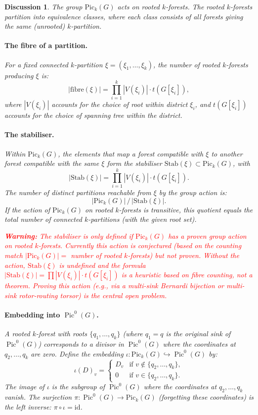 \documentclass[11pt]{article}
\newcommand{\warning}[1]{\textcolor{red}{\textbf{Warning:} #1}}
\newcommand{\Pic}{\operatorname{Pic}^0}
\newtheorem{answer}{Discussion}
\begin{document}
\begin{answer}
The group $\mathrm{Pic}_k(G)$ acts on rooted $k$-forests. The rooted
$k$-forests partition into equivalence classes, where each class consists of
all forests giving the same (unrooted) $k$-partition.

\paragraph{The fibre of a partition.}
For a fixed connected $k$-partition $\xi = (\xi_1, \ldots, \xi_k)$, the
number of rooted $k$-forests producing $\xi$ is:
\[
  |\text{fibre}(\xi)| = \prod_{i=1}^{k} |V(\xi_i)| \cdot t(G[\xi_i]),
\]
where $|V(\xi_i)|$ accounts for the choice of root within district $\xi_i$,
and $t(G[\xi_i])$ accounts for the choice of spanning tree within the district.

\paragraph{The stabiliser.}
Within $\mathrm{Pic}_k(G)$, the elements that map a forest compatible with
$\xi$ to another forest compatible with the same $\xi$ form the
\emph{stabiliser} $\mathrm{Stab}(\xi) \subset \mathrm{Pic}_k(G)$, with
\[
  |\mathrm{Stab}(\xi)| = \prod_{i=1}^{k} |V(\xi_i)| \cdot t(G[\xi_i]).
\]
The number of distinct partitions reachable from $\xi$ by the group action is:
\[
  |\mathrm{Pic}_k(G)| \,/\, |\mathrm{Stab}(\xi)|.
\]
If the action of $\mathrm{Pic}_k(G)$ on rooted $k$-forests is transitive,
this quotient equals the total number of connected $k$-partitions (with the
given root set).

\warning{The stabiliser is only defined if $\mathrm{Pic}_k(G)$ has a proven
group action on rooted $k$-forests. Currently this action is conjectured (based
on the counting match $|\mathrm{Pic}_k(G)| = $ number of rooted $k$-forests)
but not proven. Without the action, $\mathrm{Stab}(\xi)$ is undefined and the
formula $|\mathrm{Stab}(\xi)| = \prod |V(\xi_i)| \cdot t(G[\xi_i])$ is a
heuristic based on fibre counting, not a theorem. Proving this action (e.g.,
via a multi-sink Bernardi bijection or multi-sink rotor-routing torsor) is the
central open problem.}

\paragraph{Embedding into $\Pic(G)$.}
A rooted $k$-forest with roots $\{q_1, \ldots, q_k\}$ (where $q_1 = q$ is
the original sink of $\Pic(G)$) corresponds to a divisor in $\Pic(G)$ where
the coordinates at $q_2, \ldots, q_k$ are zero. Define the embedding
$\iota : \mathrm{Pic}_k(G) \hookrightarrow \Pic(G)$ by:
\[
  \iota(D)_v =
  \begin{cases}
    D_v & \text{if } v \notin \{q_2, \ldots, q_k\}, \\
    0   & \text{if } v \in \{q_2, \ldots, q_k\}.
  \end{cases}
\]
The image of $\iota$ is the subgroup of $\Pic(G)$ where the coordinates at
$q_2, \ldots, q_k$ vanish. The surjection
$\pi : \Pic(G) \to \mathrm{Pic}_k(G)$ (forgetting these coordinates) is the
left inverse: $\pi \circ \iota = \mathrm{id}$.


\end{answer}
\end{document}
